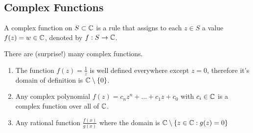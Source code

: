 \documentclass[../notes.tex]{subfiles}
\begin{document}

\subsection{Complex Functions}

\begin{definition}
    A complex function on $S \subset \mathbb{C}$ is a rule that assigns to each $z \in S$ a value $f(z) = w \in \mathbb{C}$, denoted by $f : S \to \mathbb{C}$.
\end{definition}

\begin{example}
    There are (surprise!) many complex functions.
    \begin{enumerate}
        \item The function $f(z) = \frac{1}{z}$ is well defined everywhere except $z = 0$, therefore it's domain of definition is $\mathbb{C} \setminus \qty{0}$.
        \item Any complex polynomial $f(z) = c_n z^n + \ldots + c_1 z + c_0$ with $c_i \in \mathbb{C}$ is a complex function over all of $\mathbb{C}$.
        \item Any rational function $\frac{f(x)}{g(x)}$ where the domain is $\mathbb{C} \setminus \qty{z \in \mathbb{C}: g(z) = 0}$
    \end{enumerate}
\end{example}
\end{document}
